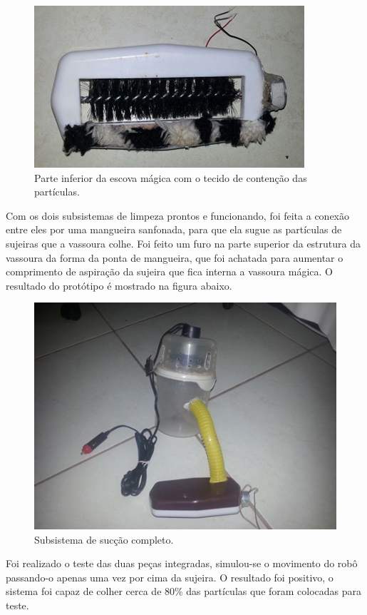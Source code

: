 		\begin{figure}[H]
			\centering
			\includegraphics[scale=1]{figuras/asppc2_12.jpg}
			\caption{Parte inferior da escova mágica com o tecido de contenção das partículas.}
			\label{img:escova_com_tecido}
		\end{figure}

		Com os dois subsistemas de limpeza prontos e funcionando, foi feita a conexão entre eles por uma mangueira sanfonada, para que ela sugue as partículas de sujeiras que a vassoura colhe. Foi feito um furo na parte superior da estrutura da vassoura da forma da ponta de mangueira, que foi achatada para aumentar o comprimento de aspiração da sujeira que fica interna a vassoura mágica. O resultado do protótipo é mostrado na figura abaixo.

		\begin{figure}[H]
			\centering
			\includegraphics[scale=1]{figuras/asppc2_13.jpg}
			\caption{Subsistema de sucção completo.}
			\label{img:sistema_completo}
		\end{figure}

		Foi realizado o teste das duas peças integradas, simulou-se o movimento do robô passando-o apenas uma vez por cima da sujeira. O resultado foi positivo, o sistema foi capaz de colher cerca de 80\% das partículas que foram colocadas para teste.

